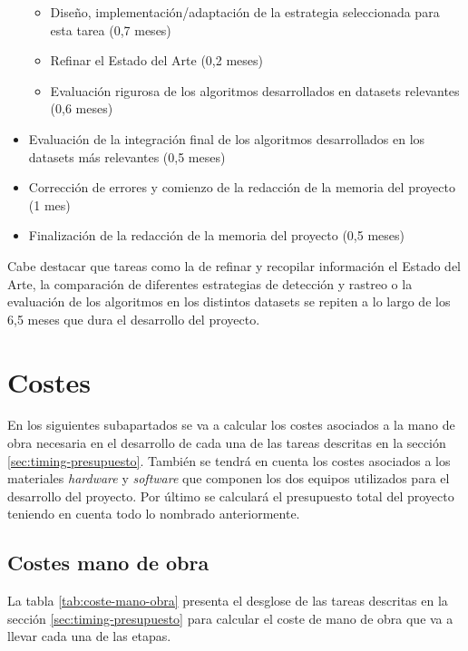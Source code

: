\begin{itemize}
    \begin{itemize}
        \item Diseño, implementación/adaptación de la estrategia seleccionada para esta tarea (0,7 meses)
        \item Refinar el Estado del Arte (0,2 meses)
        \item Evaluación rigurosa de los algoritmos desarrollados en datasets relevantes (0,6 meses)
    \end{itemize}
    
    \item Evaluación de la integración final de los algoritmos desarrollados en los datasets más relevantes (0,5 meses)
    
    \item Corrección de errores y comienzo de la redacción de la memoria del proyecto (1 mes)
    
    \item Finalización de la redacción de la memoria del proyecto (0,5 meses)
\end{itemize}

Cabe destacar que tareas como la de refinar y recopilar información el Estado del Arte, la comparación de diferentes estrategias de detección y rastreo o la evaluación de los algoritmos en los distintos datasets se repiten a lo largo de los 6,5 meses que dura el desarrollo del proyecto.

\section{Costes}
\label{sec:costes-presupuesto}

En los siguientes subapartados se va a calcular los costes asociados a la mano de obra necesaria en el desarrollo de cada una de las tareas descritas en la sección \ref{sec:timing-presupuesto}. También se tendrá en cuenta los costes asociados a los materiales \textit{hardware} y \textit{software} que componen los dos equipos utilizados para el desarrollo del proyecto. Por último se calculará el presupuesto total del proyecto teniendo en cuenta todo lo nombrado anteriormente.

\subsection{Costes mano de obra}
\label{subsec:costes-mano-obra}

La tabla \ref{tab:coste-mano-obra} presenta el desglose de las tareas descritas en la sección \ref{sec:timing-presupuesto} para calcular el coste de mano de obra que va a llevar cada una de las etapas.

